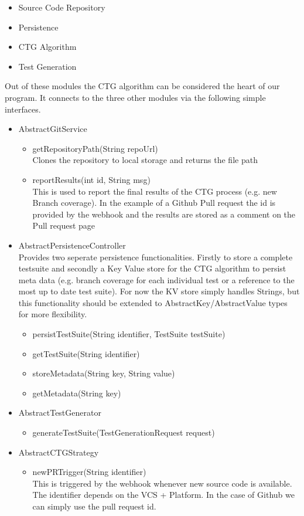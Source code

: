 \documentclass[12pt, a4paper]{article}
\begin{document}
\begin{itemize}
  \item Source Code Repository
  \item Persistence
  \item CTG Algorithm
  \item Test Generation
\end{itemize}

Out of these modules the CTG algorithm can be considered the heart of our program. It connects to the three other modules via the following simple interfaces.

\begin{itemize}
  \item AbstractGitService
  \begin{itemize}
    \item getRepositoryPath(String repoUrl) \\
    Clones the repository to local storage and returns the file path
    \item reportResults(int id, String msg) \\
    This is used to report the final results of the CTG process (e.g. new Branch coverage). In the example of a Github Pull request the id is provided by the webhook and the results are stored as a comment on the Pull request page
  \end{itemize}
  \item AbstractPersistenceController \\
  Provides two seperate persistence functionalities. Firstly to store a complete testsuite and secondly a Key Value store for the CTG algorithm to persist meta data (e.g. branch coverage for each individual test or a reference to the most up to date test suite).
  For now the KV store simply handles Strings, but this functionality should be extended to AbstractKey/AbstractValue types for more flexibility.
  \begin{itemize}
    \item persistTestSuite(String identifier, TestSuite testSuite)
    \item getTestSuite(String identifier)
    \item storeMetadata(String key, String value)
    \item getMetadata(String key)
  \end{itemize}
  \item AbstractTestGenerator
  \begin{itemize}
    \item generateTestSuite(TestGenerationRequest request)
  \end{itemize}
  \item AbstractCTGStrategy
  \begin{itemize}
    \item newPRTrigger(String identifier) \\
    This is triggered by the webhook whenever new source code is available. The identifier depends on the VCS + Platform. In the case of Github we can simply use the pull request id.
  \end{itemize}
\end{itemize}
\end{document}
